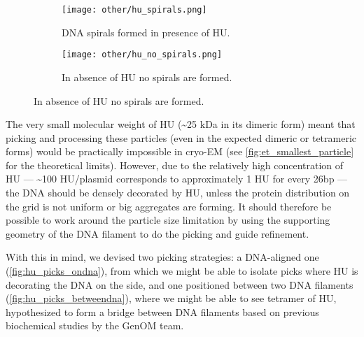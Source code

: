 \begin{figure}[ht]
    \centering
    \begin{subfigure}[B]{.49\textwidth}
        \centering
        \texttt{[image: other/hu\_spirals.png]}
        \caption{DNA spirals formed in presence of HU.}
        \label{fig:hu_spirals}
    \end{subfigure}%
    \hfill
    \begin{subfigure}[B]{.49\textwidth}
        \centering
        \texttt{[image: other/hu\_no\_spirals.png]}
        \caption{In absence of HU no spirals are formed.}
        \label{fig:hu_no_spirals}
    \end{subfigure}%
    \label{fig:hu_spirals_all}
\end{figure}

The very small molecular weight of HU (\sim25 kDa in its dimeric form) meant that picking and processing these particles (even in the expected dimeric or tetrameric forms) would be practically impossible in cryo-EM (see \autoref{fig:et_smallest_particle} for the theoretical limits).
However, due to the relatively high concentration of HU --- \sim100 HU/plasmid corresponds to approximately 1 HU for every 26bp --- the DNA should be densely decorated by HU, unless the protein distribution on the grid is not uniform or big aggregates are forming.
It should therefore be possible to work around the particle size limitation by using the supporting geometry of the DNA filament to do the picking and guide refinement.

With this in mind, we devised two picking strategies: a DNA-aligned one (\autoref{fig:hu_picks_ondna}), from which we might be able to isolate picks where HU is decorating the DNA on the side, and one positioned between two DNA filaments (\autoref{fig:hu_picks_betweendna}), where we might be able to see tetramer of HU, hypothesized to form a bridge between DNA filaments based on previous biochemical studies by the GenOM team.

